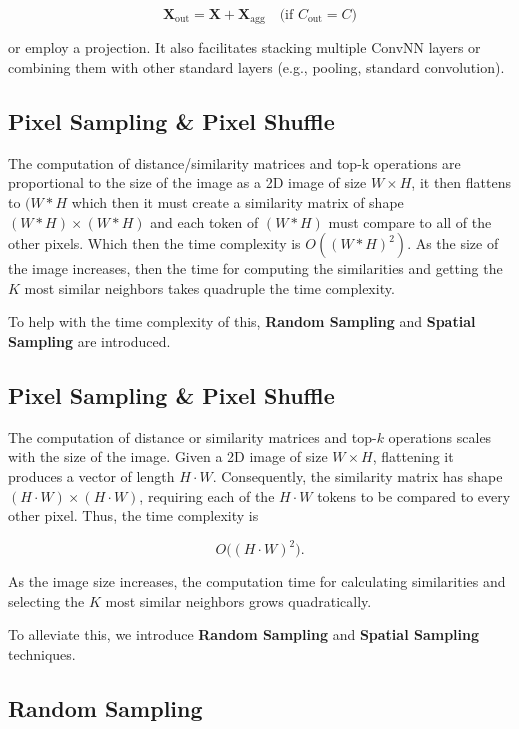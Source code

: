 \documentclass{article}
\begin{document}
\[
    \mathbf{X}_{\text{out}} = \mathbf{X} + \mathbf{X}_{\text{agg}} \quad \text{(if } C_{\text{out}} = C \text{)}
\]

or employ a projection. It also facilitates stacking multiple ConvNN layers or combining them with other standard layers (e.g., pooling, standard convolution). 


\subsection{Pixel Sampling \& Pixel Shuffle}
The computation of distance/similarity matrices and top-k operations are proportional to the size of the image as a 2D image of size \(W \times H\), it then flattens to \((W*H\) which then it must create a similarity matrix of shape \((W*H) \times (W*H)\) and each token of \((W*H)\) must compare to all of the other pixels. Which then the  time complexity is \(O((W*H)^2)\). As the size of the image increases, then the time for computing the similarities and getting the $K$ most similar neighbors takes quadruple the time complexity. 

To help with the time complexity of this, \textbf{Random Sampling} and \textbf{Spatial Sampling} are introduced. 

\subsection{Pixel Sampling \& Pixel Shuffle}

The computation of distance or similarity matrices and top-\(k\) operations scales with the size of the image. Given a 2D image of size \(W \times H\), flattening it produces a vector of length \(H \cdot W\). Consequently, the similarity matrix has shape \((H \cdot W) \times (H \cdot W)\), requiring each of the \(H \cdot W\) tokens to be compared to every other pixel. Thus, the time complexity is

\[
O\big((H \cdot W)^2\big).
\]

As the image size increases, the computation time for calculating similarities and selecting the \(K\) most similar neighbors grows quadratically.

To alleviate this, we introduce \textbf{Random Sampling} and \textbf{Spatial Sampling} techniques.

\subsection*{Random Sampling}
\end{document}
